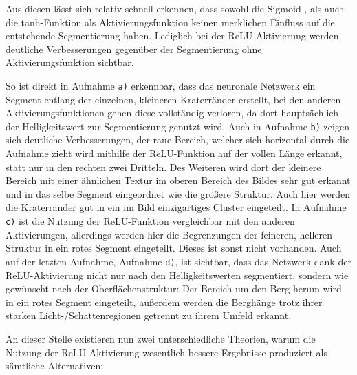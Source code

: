 Aus diesen lässt sich relativ schnell erkennen, dass sowohl die Sigmoid-, als auch die tanh-Funktion als Aktivierungsfunktion keinen merklichen Einfluss auf die entstehende Segmentierung haben. Lediglich bei der ReLU-Aktivierung werden deutliche Verbesserungen gegenüber der Segmentierung ohne Aktivierungsfunktion sichtbar.

So ist direkt in Aufnahme \texttt{a)} erkennbar, dass das neuronale Netzwerk ein Segment entlang der einzelnen, kleineren Kraterränder erstellt, bei den anderen Aktivierungsfunktionen gehen diese vollständig verloren, da dort hauptsächlich der Helligkeitswert zur Segmentierung genutzt wird. Auch in Aufnahme \texttt{b)} zeigen sich deutliche Verbesserungen, der raue Bereich, welcher sich horizontal durch die Aufnahme zieht wird mithilfe der ReLU-Funktion auf der vollen Länge erkannt, statt nur in den rechten zwei Dritteln. Des Weiteren wird dort der kleinere Bereich mit einer ähnlichen Textur im oberen Bereich des Bildes sehr gut erkannt und in das selbe Segment eingeordnet wie die größere Struktur. Auch hier werden die Kraterränder gut in ein im Bild einzigartiges Cluster eingeteilt. In Aufnahme \texttt{c)} ist die Nutzung der ReLU-Funktion vergleichbar mit den anderen Aktivierungen, allerdings werden hier die Begrenzungen der feineren, helleren Struktur in ein rotes Segment eingeteilt. Dieses ist sonst nicht vorhanden. Auch auf der letzten Aufnahme, Aufnahme \texttt{d)}, ist sichtbar, dass das Netzwerk dank der ReLU-Aktivierung nicht nur nach den Helligkeitswerten segmentiert, sondern wie gewünscht nach der Oberflächenstruktur: Der Bereich um den Berg herum wird in ein rotes Segment eingeteilt, außerdem werden die Berghänge trotz ihrer starken Licht-/Schattenregionen getrennt zu ihrem Umfeld erkannt.

An dieser Stelle existieren nun zwei unterschiedliche Theorien, warum die Nutzung der ReLU-Aktivierung wesentlich bessere Ergebnisse produziert als sämtliche Alternativen:

